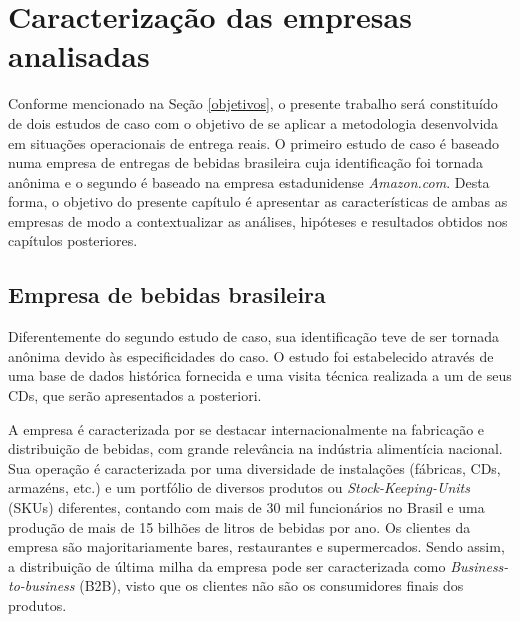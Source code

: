 \chapter{Caracterização das empresas analisadas} \label{sec:Contexto}

Conforme mencionado na Seção \ref{objetivos}, o presente trabalho será constituído de dois estudos de caso com o objetivo de se aplicar a metodologia desenvolvida em situações operacionais de entrega reais.
O primeiro estudo de caso é baseado numa empresa de entregas de bebidas brasileira cuja identificação foi tornada anônima e o segundo é baseado na empresa estadunidense \textit{Amazon.com}. 
Desta forma, o objetivo do presente capítulo é apresentar as características de ambas as empresas de modo a contextualizar as análises, hipóteses e resultados obtidos nos capítulos posteriores.

\section{Empresa de bebidas brasileira} \label{sec:realidade_empresa}

Diferentemente do segundo estudo de caso, sua identificação teve de ser tornada anônima devido às especificidades do caso.
O estudo foi estabelecido através de uma base de dados histórica fornecida e uma visita técnica realizada a um de seus CDs, que serão apresentados a posteriori.

A empresa é caracterizada por se destacar internacionalmente na fabricação e distribuição de bebidas, com grande relevância na indústria alimentícia nacional.
Sua operação é caracterizada por uma diversidade de instalações (fábricas, CDs, armazéns, etc.) e um portfólio de diversos produtos ou \textit{Stock-Keeping-Units} (SKUs) diferentes, contando com mais de 30 mil funcionários no Brasil e uma produção de mais de 15 bilhões de litros de bebidas por ano.
Os clientes da empresa são majoritariamente bares, restaurantes e supermercados. Sendo assim, a distribuição de última milha da empresa pode ser caracterizada como \textit{Business-to-business} (B2B), visto que os clientes não são os consumidores finais dos produtos.

